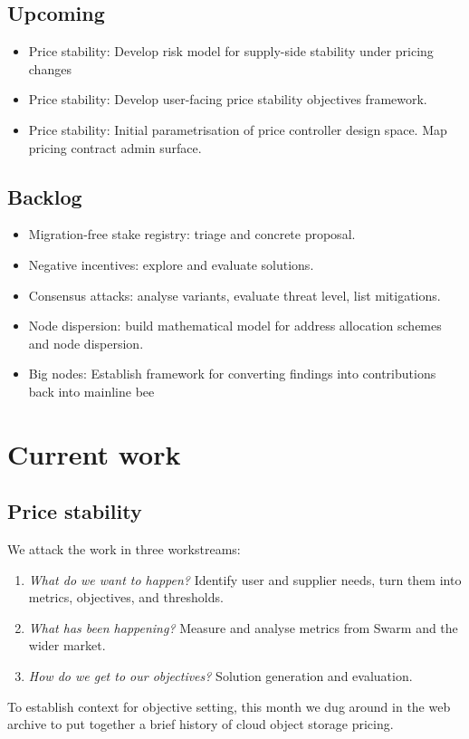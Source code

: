 \subsection*{Upcoming}

\begin{itemize}
  \item Price stability: Develop risk model for supply-side stability under pricing changes
  \item Price stability: Develop user-facing price stability objectives framework. 
  \item Price stability: Initial parametrisation of price controller design space. Map pricing contract admin surface.
\end{itemize}

\subsection*{Backlog}
\begin{itemize}
  \item Migration-free stake registry: triage and concrete proposal.
  \item Negative incentives: explore and evaluate solutions.
  \item Consensus attacks: analyse variants, evaluate threat level, list mitigations.
  \item Node dispersion: build mathematical model for address allocation schemes and node dispersion.
  \item Big nodes: Establish framework for converting findings into contributions back into mainline bee
\end{itemize}


\section*{Current work}

\subsection*{Price stability}
%
We attack the work in three workstreams:
\begin{enumerate}
  \item \emph{What do we want to happen?} Identify user and supplier needs, turn them into metrics, objectives, and thresholds.
  \item \emph{What has been happening?} Measure and analyse metrics from Swarm and the wider market.
  \item \emph{How do we get to our objectives?} Solution generation and evaluation.
\end{enumerate}
%
To establish context for objective setting, this month we dug around in the web archive to put together a brief history of cloud object storage pricing.


